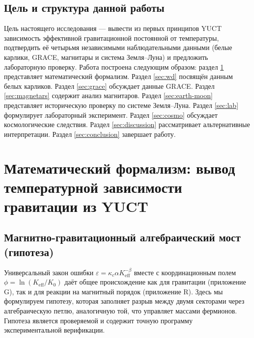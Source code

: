 \documentclass[12pt]{article}
\theoremstyle{remark}
\newcommand{\Keff}{K_{\mathrm{eff}}}
\newcommand{\kappac}{\kappa_c}
\begin{document}
	\subsection{Цель и структура данной работы}
	\label{subsec:purpose}
	
	Цель настоящего исследования — вывести из первых принципов YUCT зависимость эффективной гравитационной постоянной от температуры, подтвердить её четырьмя независимыми наблюдательными данными (белые карлики, GRACE, магнитары и система Земля–Луна) и предложить лабораторную проверку. Работа построена следующим образом: раздел \ref{sec:math} представляет математический формализм. Раздел \ref{sec:wd} посвящён данным белых карликов. Раздел \ref{sec:grace} обсуждает данные GRACE. Раздел \ref{sec:magnetars} содержит анализ магнитаров. Раздел \ref{sec:earth-moon} представляет историческую проверку по системе Земля–Луна. Раздел \ref{sec:lab} формулирует лабораторный эксперимент. Раздел \ref{sec:cosmo} обсуждает космологические следствия. Раздел \ref{sec:discussion} рассматривает альтернативные интерпретации. Раздел \ref{sec:conclusion} завершает работу.
	
	\section{Математический формализм: вывод температурной зависимости гравитации из YUCT}
	\label{sec:math}
	
	\subsection{Магнитно-гравитационный алгебраический мост (гипотеза)}
	\label{subsec:magnetism-bridge}
	
	Универсальный закон ошибки $\varepsilon = \kappac \alpha \Keff^{-\beta}$ вместе с координационным полем $\phi = \ln(\Keff/K_0)$ даёт общее происхождение как для гравитации (приложение G), так и для реакции на магнитный порядок (приложение R).  
	Здесь мы формулируем гипотезу, которая заполняет разрыв между двумя секторами через алгебраическую петлю, аналогичную той, что управляет массами фермионов.  
	Гипотеза является проверяемой и содержит точную программу экспериментальной верификации.
	
\end{document}
